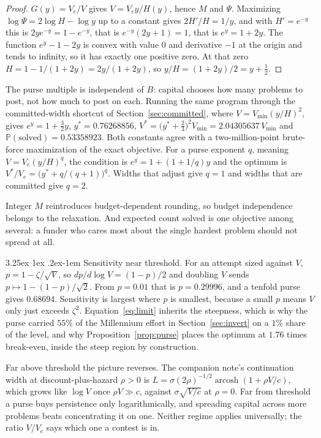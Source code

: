 \documentclass[11pt]{article}
\makeatletter
\renewcommand\paragraph{\@startsection{paragraph}{4}{\z@}%
  {3.25ex \@plus1ex \@minus.2ex}{-1em}%
  {\normalfont\normalsize\itshape}}
\theoremstyle{itheads}
\newcommand{\PP}{\mathbb{P}}
\DeclareMathOperator{\arcosh}{arcosh}
\makeatother
\begin{document}
\begin{proof}
$G(y)=V_{e}/V$ gives $V=V_{e}y/H(y)$, hence $M$ and $\Psi$. Maximizing
$\log\Psi=2\log H-\log y$ up to a constant gives $2H'/H=1/y$, and with
$H'=e^{-y}$ this is $2ye^{-y}=1-e^{-y}$, that is $e^{-y}(2y+1)=1$, that is
$e^{y}=1+2y$. The function $e^{y}-1-2y$ is convex with value $0$ and
derivative $-1$ at the origin and tends to infinity, so it has exactly one
positive zero. At that zero $H=1-1/(1+2y)=2y/(1+2y)$, so
$y/H=(1+2y)/2=y+\tfrac12$.
\end{proof}

The purse multiple is independent of $B$: capital chooses how many
problems to post, not how much to post on each. Running the same program
through the committed-width shortcut of Section~\ref{sec:committed}, where
$V=V_{\min}(y/H)^{2}$, gives $e^{y}=1+\tfrac32y$, $y^{*}=0.76268856$,
$V^{*}=\big(y^{*}+\tfrac23\big)^{2}V_{\min}=2.04305637\,V_{\min}$ and
$\PP(\text{solved})=0.53358923$. Both constants agree with a
two-million-point brute-force maximization of the exact objective. For a
purse exponent $q$, meaning $V=V_{e}(y/H)^{q}$, the condition is
$e^{y}=1+(1+1/q)y$ and the optimum is
$V^{*}/V_{e}=\big(y^{*}+q/(q+1)\big)^{q}$. Widths that adjust give $q=1$ and
widths that are committed give $q=2$.

Integer $M$ reintroduces budget-dependent rounding, so budget independence
belongs to the relaxation. And expected count solved is one objective
among several: a funder who cares most about the single hardest problem
should not spread at all.

\paragraph{Sensitivity near threshold.}
For an attempt sized against $V$, $p=1-\zeta/\sqrt V$, so
$dp/d\log V=(1-p)/2$ and doubling $V$ sends $p\mapsto1-(1-p)/\sqrt2$. From
$p=0.01$ that is $p=0.29996$, and a tenfold purse gives $0.68694$.
Sensitivity is largest where $p$ is smallest, because a small $p$ means
$V$ only just exceeds $\zeta^{2}$. Equation~\eqref{eq:limit} inherits the
steepness, which is why the purse carried $55\%$ of the Millennium effort
in Section~\ref{sec:invert} on a $1\%$ share of the level, and why
Proposition~\ref{prop:purse} places the optimum at $1.76$ times break-even,
inside the steep region by construction.

Far above threshold the picture reverses. The companion note's
continuation width at discount-plus-hazard $\rho>0$ is
$L=\sigma(2\rho)^{-1/2}\arcosh(1+\rho V/c)$, which grows like $\log V$
once $\rho V\gg c$, against $\sigma\sqrt{V/c}$ at $\rho=0$. Far from
threshold a purse buys persistence only logarithmically, and spreading
capital across more problems beats concentrating it on one. Neither regime
applies universally; the ratio $V/V_{e}$ says which one a contest is in.
\end{document}
